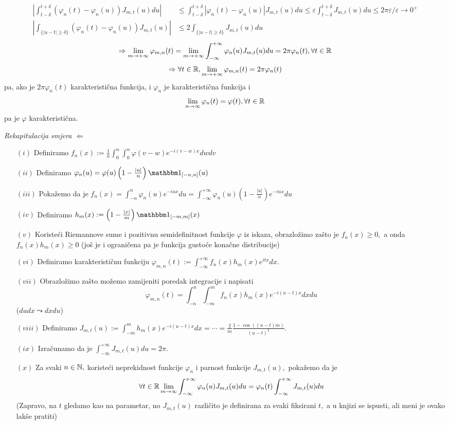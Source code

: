 \documentclass{article}
\begin{document}
\begin{itemize}
\[\begin{aligned}\left|\int_{t-\delta}^{t+\delta}(\varphi_n(t)-\varphi_n(u))J_{m,t}(u)du\right|&\le\int_{t-\delta}^{t+\delta}|\varphi_n(t)-\varphi_n(u)|J_{m,t}(u)du\le\varepsilon\int_{t-\delta}^{t+\delta}J_{m,t}(u)du\le2\pi\varepsilon\big/\varepsilon\to 0^+\\\left|\int_{\{|u-t|\ge\delta\}}(\varphi_n(t)-\varphi_n(u))J_{m,t}(u)\right|&\le 2\int_{\{|u-t|\ge\delta\}}J_{m,t}(u)du\end{aligned}\] \[\Rightarrow\lim_{m\to+\infty}\varphi_{m,n}(t)=\lim_{m\to+\infty}\int_{-\infty}^{+\infty}\varphi_n(u)J_{m,t}(u)du=2\pi\varphi_n(t),\forall t\in\Bbb R\]\[\Rightarrow\forall t\in\Bbb R,\lim_{m\to+\infty}\varphi_{m,n}(t)=2\pi\varphi_n(t)\] pa, ako je \(2\pi\varphi_n(t)\) karakteristična funkcija, i \(\varphi_n\) je karakteristična funkcija i \[\lim_{n\to\infty}\varphi_n(t)=\varphi(t),\forall t\in\Bbb R\] pa je \(\varphi\) karakteristična. 
\end{itemize}
\emph{Rekapitulacija smjera \(\Leftarrow\)}
\begin{enumerate}
    \item[\((i)\)] Definiramo \(f_n(x):=\frac1n\int_0^n\int_0^n\varphi(v-w)e^{-i(v-w)x}dwdv\)
    \item[\((ii)\)] Definiramo \(\varphi_n(u)=\varphi(u)\left(1-\frac{|u|}n\right)\mathbbm 1_{[-n,n]}(u)\)
    \item[\((iii)\)] Pokažemo da je \(f_n(x)=\int_{-n}^n\varphi_n(u)e^{-iux}du=\int_{-\infty}^{+\infty}\varphi_n(u)\left(1-\frac{|u|}n\right)e^{-iux}du\)
    \item[\((iv)\)] Definiramo \(h_m(x):=\left(1-\frac{|x|}m\right)\mathbbm 1_{[-m,m]}(x)\)
    \item[\((v)\)] Koristeći Riemannove sume i pozitivnu semidefinitnost funkcije \(\varphi\) iz iskaza, obrazložimo zašto je \(f_n(x)\ge0,\) a onda \(f_n(x)h_m(x)\ge0\) (još je i ograničena pa je funkcija gustoće konačne distribucije)
    \item[\((vi)\)] Definiramo karakterističnu funkciju \(\varphi_{m,n}(t):=\int_{-\infty}^{+\infty}f_n(x)h_m(x)e^{itx}dx.\) 
    \item[\((vii)\)] Obrazložimo zašto možemo zamijeniti poredak integracije i napisati \[\varphi_{m,n}(t)=\int_{-n}^n\int_{-m}^mf_n(x)h_m(x)e^{-i(u-t)x}dxdu\] (\(dudx\leadsto dxdu\))
    \item[\((viii)\)] Definiramo \(J_{m,t}(u):=\int_{-m}^mh_m(x)e^{-i(u-t)x}dx=\cdots=\frac2m\frac{1-\cos((u-t)m)}{(u-t)^2}.\)
    \item[\((ix)\)] Izračunamo da je \(\int_{-\infty}^{+\infty}J_{m,t}(u)du=2\pi.\) 
    \item[\((x)\)] Za svaki \(n\in\Bbb N,\) koristeći neprekidnost funkcije \(\varphi_n\) i parnost funkcije \(J_{m,t}(u),\) pokažemo da je \[\forall t\in\Bbb R\lim\limits_{m\to\infty}\int_{-\infty}^{+\infty}\varphi_n(u)J_{m,t}(u)du=\varphi_n(t)\int_{-\infty}^{+\infty}J_{m,t}(u)du\] (Zapravo, na \(t\) gledamo kao na parametar, no \(J_{m,t}(u)\) različito je definirana za svaki fiksirani \(t,\) a u knjizi se ispusti, ali meni je ovako lakše pratiti)
\end{enumerate}
\end{document}
